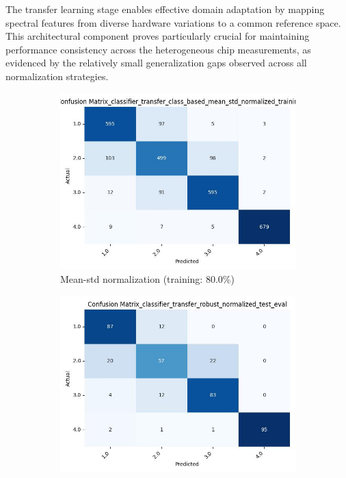 The transfer learning stage enables effective domain adaptation by mapping spectral features from diverse hardware variations to a common reference space. This architectural component proves particularly crucial for maintaining performance consistency across the heterogeneous chip measurements, as evidenced by the relatively small generalization gaps observed across all normalization strategies.

\begin{figure}[H]
\centering
\begin{subfigure}[b]{0.45\textwidth}
  \centering
  \includegraphics[width=\textwidth]{out/10chips/class_based_mean_std_normalized/confusion_matrix_classifier_transfer_class_based_mean_std_normalized_training_eval.jpg}
  \caption{Mean-std normalization (training: 80.0\%)}
  \label{fig:confusion_matrix_training_10}
\end{subfigure}
\hfill
\begin{subfigure}[b]{0.45\textwidth}
  \centering
  \includegraphics[width=\textwidth]{out/10chips/robust_normalized/confusion_matrix_classifier_transfer_robust_normalized_test_eval.jpg}

\end{subfigure}
\end{figure}
